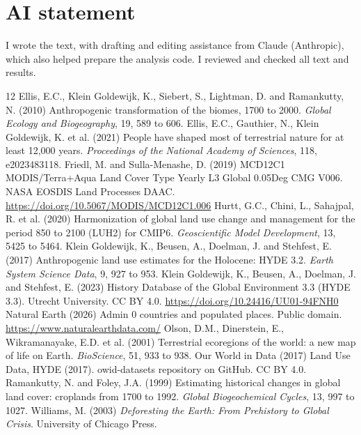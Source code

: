 \documentclass[11pt,a4paper]{article}
\begin{document}
\section*{AI statement}
I wrote the text, with drafting and editing assistance from Claude (Anthropic), which also helped prepare the analysis code. I reviewed and checked all text and results.

\begin{thebibliography}{12}
 Ellis, E.C., Klein Goldewijk, K., Siebert, S., Lightman, D. and Ramankutty, N. (2010) Anthropogenic transformation of the biomes, 1700 to 2000. \emph{Global Ecology and Biogeography}, 19, 589 to 606.
 Ellis, E.C., Gauthier, N., Klein Goldewijk, K. et al. (2021) People have shaped most of terrestrial nature for at least 12,000 years. \emph{Proceedings of the National Academy of Sciences}, 118, e2023483118.
 Friedl, M. and Sulla-Menashe, D. (2019) MCD12C1 MODIS/Terra+Aqua Land Cover Type Yearly L3 Global 0.05Deg CMG V006. NASA EOSDIS Land Processes DAAC. \url{https://doi.org/10.5067/MODIS/MCD12C1.006}
 Hurtt, G.C., Chini, L., Sahajpal, R. et al. (2020) Harmonization of global land use change and management for the period 850 to 2100 (LUH2) for CMIP6. \emph{Geoscientific Model Development}, 13, 5425 to 5464.
 Klein Goldewijk, K., Beusen, A., Doelman, J. and Stehfest, E. (2017) Anthropogenic land use estimates for the Holocene: HYDE 3.2. \emph{Earth System Science Data}, 9, 927 to 953.
 Klein Goldewijk, K., Beusen, A., Doelman, J. and Stehfest, E. (2023) History Database of the Global Environment 3.3 (HYDE 3.3). Utrecht University. CC BY 4.0. \url{https://doi.org/10.24416/UU01-94FNH0}
 Natural Earth (2026) Admin 0 countries and populated places. Public domain. \url{https://www.naturalearthdata.com/}
 Olson, D.M., Dinerstein, E., Wikramanayake, E.D. et al. (2001) Terrestrial ecoregions of the world: a new map of life on Earth. \emph{BioScience}, 51, 933 to 938.
 Our World in Data (2017) Land Use Data, HYDE (2017). owid-datasets repository on GitHub. CC BY 4.0.
 Ramankutty, N. and Foley, J.A. (1999) Estimating historical changes in global land cover: croplands from 1700 to 1992. \emph{Global Biogeochemical Cycles}, 13, 997 to 1027.
 Williams, M. (2003) \emph{Deforesting the Earth: From Prehistory to Global Crisis}. University of Chicago Press.
\end{thebibliography}
\end{document}
